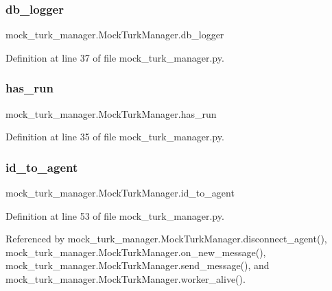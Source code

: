 \subsubsection{\texorpdfstring{db\+\_\+logger}{db\_logger}}
{\footnotesize\ttfamily mock\+\_\+turk\+\_\+manager.\+Mock\+Turk\+Manager.\+db\+\_\+logger}



Definition at line 37 of file mock\+\_\+turk\+\_\+manager.\+py.

\mbox{\label{classmock__turk__manager_1_1MockTurkManager_a8cc5a64c1f570db4b9fb075faf761b46}} 
\subsubsection{\texorpdfstring{has\+\_\+run}{has\_run}}
{\footnotesize\ttfamily mock\+\_\+turk\+\_\+manager.\+Mock\+Turk\+Manager.\+has\+\_\+run}



Definition at line 35 of file mock\+\_\+turk\+\_\+manager.\+py.

\mbox{\label{classmock__turk__manager_1_1MockTurkManager_af059906f05b261ab7f54b79e4651a5d5}} 
\subsubsection{\texorpdfstring{id\+\_\+to\+\_\+agent}{id\_to\_agent}}
{\footnotesize\ttfamily mock\+\_\+turk\+\_\+manager.\+Mock\+Turk\+Manager.\+id\+\_\+to\+\_\+agent}



Definition at line 53 of file mock\+\_\+turk\+\_\+manager.\+py.



Referenced by mock\+\_\+turk\+\_\+manager.\+Mock\+Turk\+Manager.\+disconnect\+\_\+agent(), mock\+\_\+turk\+\_\+manager.\+Mock\+Turk\+Manager.\+on\+\_\+new\+\_\+message(), mock\+\_\+turk\+\_\+manager.\+Mock\+Turk\+Manager.\+send\+\_\+message(), and mock\+\_\+turk\+\_\+manager.\+Mock\+Turk\+Manager.\+worker\+\_\+alive().


